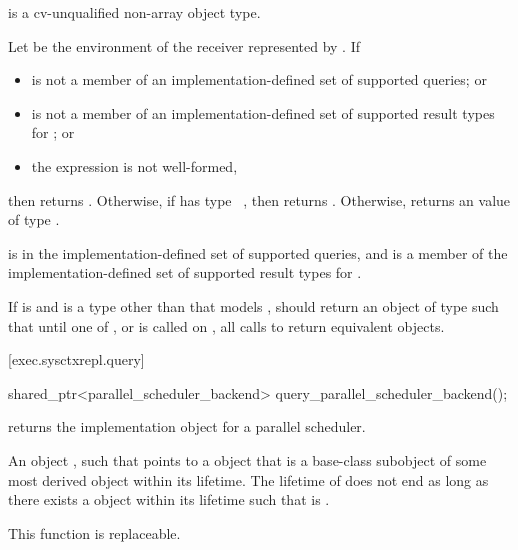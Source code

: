 \begin{itemdescr}
\pnum
\mandates
{} is a cv-unqualified non-array object type.

\pnum
\returns
Let  be the environment of the receiver represented by .
If
\begin{itemize}
\item
{} is not a member of an implementation-defined set
of supported queries; or
\item
{} is not a member of an implementation-defined set
of supported result types for ; or
\item
the expression  is not well-formed,
\end{itemize}
then returns .
Otherwise, if  has type \cv{}~,
then returns .
Otherwise, returns an
 value
of type .

\pnum
\remarks
{} is
in the implementation-defined set of supported queries, and
 is a member
of the implementation-defined set of supported result types
for .

\pnum
\recommended
If  is  and
 is a type other than 
that models ,
 should return an object of type 
such that until one of
,
 or
is called on ,
all calls to  return equivalent  objects.
\end{itemdescr}

[exec.sysctxrepl.query]{}

%
\begin{itemdecl}
shared_ptr<parallel_scheduler_backend> query_parallel_scheduler_backend();
\end{itemdecl}

\begin{itemdescr}
\pnum
{} returns
the implementation object for a parallel scheduler.

\pnum
\returns
An object ,
such that  points to a  object
that is a base-class subobject
of some most derived object  within its lifetime.
The lifetime of  does not end
as long as there exists a  object  within its lifetime
such that  is .

\pnum
\remarks
This function is replaceable.
\end{itemdescr}


